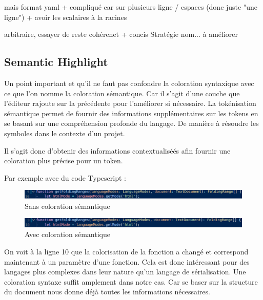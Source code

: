\documentclass[
    iict, %
    il, %
]{heig-tb}
\begin{document}
mais format yaml + compliqué car sur plusieurs ligne / espaces (donc juste "une ligne")
+ avoir les scalaires à la racines

arbitraire, essayer de reste cohérenet + concis
Stratégie nom... à améliorer

\subsection{Semantic Highlight}

Un point important et qu'il ne faut pas confondre la coloration syntaxique avec ce que l'on nomme la coloration sémantique. Car il s'agit d'une couche que l'éditeur rajoute sur la précédente pour l'améliorer si nécessaire.
La tokénisation sémantique permet de fournir des informations supplémentaires sur les tokens en se basant sur une compréhension profonde du langage.
De manière à résoudre les symboles dans le contexte d'un projet.

Il s'agit donc d'obtenir des informations contextualiséés afin fournir une coloration plus précise pour un token.

Par exemple avec du code Typescript :

\begin{figure}[!h]
    \begin{center}
        \includegraphics[width=15cm]{assets/figures/semantic-coloration-without.png}
    \end{center}
    \caption[Sans coloration sémantique]{\label{semantic-coloration-without} Sans coloration sémantique}
\end{figure}

\begin{figure}[!h]
    \begin{center}
        \includegraphics[width=15cm]{assets/figures/semantic-coloration-with.png}
    \end{center}
    \caption[Sans coloration sémantique ]{\label{semantic-coloration-with} Avec coloration sémantique }
\end{figure}

On voit à la ligne 10 que la colorisation de la fonction a changé et correspond maintenant à un paramètre d'une fonction.
Cela est donc intéressant pour des langages plus complexes dans leur nature qu'un langage de sérialisation. Une coloration syntaxe suffit amplement dans notre cas.
Car se baser sur la structure du document nous donne déjà toutes les informations nécessaires.
\end{document}
